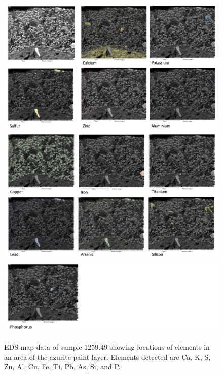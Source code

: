 \begin{figure}[H]
\centering
\begin{minipage}[t]{\linewidth}
  \centering
  \includegraphics[width=0.9\linewidth]{1259-49_mapdata_1}
\hfill
\includegraphics[width=0.9\linewidth]{1259-49_mapdata_2}
\hfill
\includegraphics[width=0.9\linewidth]{1259-49_mapdata_3}
\hfill
\end{minipage}
\caption[EDS map data, sample 1259.49.]{EDS map data of sample 1259.49 showing locations of elements in an area of the azurite paint layer. Elements detected are Ca, K, S, Zn, Al, Cu, Fe, Ti, Pb, As, Si, and P.}
\label{fig:1259.49_mapdata}
\end{figure}


